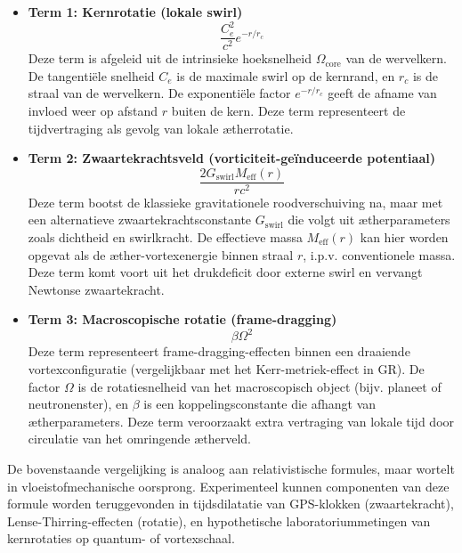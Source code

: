 \begin{itemize}
  \item \textbf{Term 1: Kernrotatie (lokale swirl)}
  \[
  \frac{C_e^2}{c^2} e^{-r/r_c}
  \]
  Deze term is afgeleid uit de intrinsieke hoeksnelheid $\Omega_\text{core}$ van de wervelkern. De tangentiële snelheid $C_e$ is de maximale swirl op de kernrand, en $r_c$ is de straal van de wervelkern. De exponentiële factor $e^{-r/r_c}$ geeft de afname van invloed weer op afstand $r$ buiten de kern. Deze term representeert de tijdvertraging als gevolg van lokale ætherrotatie.

  \item \textbf{Term 2: Zwaartekrachtsveld (vorticiteit-geïnduceerde potentiaal)}
  \[
  \frac{2 G_{\text{swirl}} M_{\text{eff}}(r)}{r c^2}
  \]
  Deze term bootst de klassieke gravitationele roodverschuiving na, maar met een alternatieve zwaartekrachtsconstante $G_{\text{swirl}}$ die volgt uit ætherparameters zoals dichtheid en swirlkracht. De effectieve massa $M_{\text{eff}}(r)$ kan hier worden opgevat als de æther-vortexenergie binnen straal $r$, i.p.v. conventionele massa. Deze term komt voort uit het drukdeficit door externe swirl en vervangt Newtonse zwaartekracht.

  \item \textbf{Term 3: Macroscopische rotatie (frame-dragging)}
  \[
  \beta \Omega^2
  \]
  Deze term representeert frame-dragging-effecten binnen een draaiende vortexconfiguratie (vergelijkbaar met het Kerr-metriek-effect in GR). De factor $\Omega$ is de rotatiesnelheid van het macroscopisch object (bijv. planeet of neutronenster), en $\beta$ is een koppelingsconstante die afhangt van ætherparameters. Deze term veroorzaakt extra vertraging van lokale tijd door circulatie van het omringende ætherveld.

\end{itemize}

De bovenstaande vergelijking is analoog aan relativistische formules, maar wortelt in vloeistofmechanische oorsprong. Experimenteel kunnen componenten van deze formule worden teruggevonden in tijdsdilatatie van GPS-klokken (zwaartekracht), Lense-Thirring-effecten (rotatie), en hypothetische laboratoriummetingen van kernrotaties op quantum- of vortexschaal.

